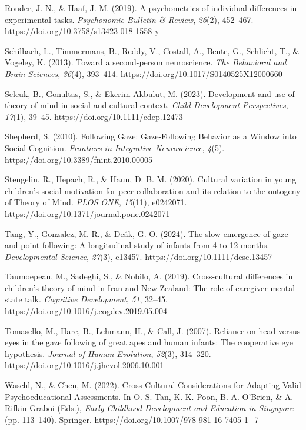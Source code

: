 \documentclass[
  man,floatsintext]{apa7}
\newlength{\cslhangindent}
\newenvironment{CSLReferences}[2] %
 {\begin{list}{}{%
  \setlength{\itemindent}{0pt}
  \setlength{\leftmargin}{0pt}
  \setlength{\parsep}{0pt}
  \ifodd #1
   \setlength{\leftmargin}{\cslhangindent}
   \setlength{\itemindent}{-1\cslhangindent}
  \fi
  \setlength{\itemsep}{#2\baselineskip}}}
 {\end{list}}
\begin{document}
\begin{CSLReferences}{1}{0}
Rouder, J. N., \& Haaf, J. M. (2019). A psychometrics of individual differences in experimental tasks. \emph{Psychonomic Bulletin \& Review}, \emph{26}(2), 452--467. \url{https://doi.org/10.3758/s13423-018-1558-y}

Schilbach, L., Timmermans, B., Reddy, V., Costall, A., Bente, G., Schlicht, T., \& Vogeley, K. (2013). Toward a second-person neuroscience. \emph{The Behavioral and Brain Sciences}, \emph{36}(4), 393--414. \url{https://doi.org/10.1017/S0140525X12000660}

Selcuk, B., Gonultas, S., \& Ekerim-Akbulut, M. (2023). Development and use of theory of mind in social and cultural context. \emph{Child Development Perspectives}, \emph{17}(1), 39--45. \url{https://doi.org/10.1111/cdep.12473}

Shepherd, S. (2010). Following {Gaze}: {Gaze-Following Behavior} as a {Window} into {Social Cognition}. \emph{Frontiers in Integrative Neuroscience}, \emph{4}(5). \url{https://doi.org/10.3389/fnint.2010.00005}

Stengelin, R., Hepach, R., \& Haun, D. B. M. (2020). Cultural variation in young children's social motivation for peer collaboration and its relation to the ontogeny of {Theory} of {Mind}. \emph{PLOS ONE}, \emph{15}(11), e0242071. \url{https://doi.org/10.1371/journal.pone.0242071}

Tang, Y., Gonzalez, M. R., \& Deák, G. O. (2024). The slow emergence of gaze- and point-following: {A} longitudinal study of infants from 4 to 12 months. \emph{Developmental Science}, \emph{27}(3), e13457. \url{https://doi.org/10.1111/desc.13457}

Taumoepeau, M., Sadeghi, S., \& Nobilo, A. (2019). Cross-cultural differences in children's theory of mind in {Iran} and {New Zealand}: {The} role of caregiver mental state talk. \emph{Cognitive Development}, \emph{51}, 32--45. \url{https://doi.org/10.1016/j.cogdev.2019.05.004}

Tomasello, M., Hare, B., Lehmann, H., \& Call, J. (2007). Reliance on head versus eyes in the gaze following of great apes and human infants: The cooperative eye hypothesis. \emph{Journal of Human Evolution}, \emph{52}(3), 314--320. \url{https://doi.org/10.1016/j.jhevol.2006.10.001}

Waschl, N., \& Chen, M. (2022). Cross-{Cultural Considerations} for {Adapting Valid Psychoeducational Assessments}. In O. S. Tan, K. K. Poon, B. A. O'Brien, \& A. Rifkin-Graboi (Eds.), \emph{Early {Childhood Development} and {Education} in {Singapore}} (pp. 113--140). Springer. \url{https://doi.org/10.1007/978-981-16-7405-1_7}

\end{CSLReferences}

\endgroup
\end{document}
